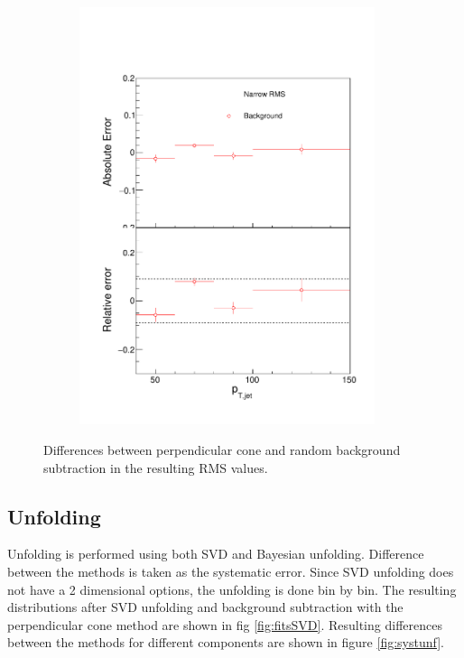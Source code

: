 \begin{figure}
\begin{subfigure}{0.24\textwidth}
\includegraphics[width=0.95\textwidth]{results/SystematicErrors/SystematicErrorsGausRMS_BgNFin00JetPt08_linx_data}
\end{subfigure}
\caption{Differences between perpendicular cone and random background subtraction in the resulting RMS values.}
\label{fig:systbg}
\end{figure}

  
  
  
  \subsection{Unfolding}
Unfolding is performed using both SVD and Bayesian unfolding. Difference between the methods is taken as the systematic error. Since SVD unfolding does not have a 2 dimensional options, the unfolding is done bin by bin. The resulting distributions after SVD unfolding and background subtraction with the perpendicular cone method are shown in fig \ref{fig:fitsSVD}. Resulting differences between the methods for different components are shown in figure \ref{fig:systunf}.

